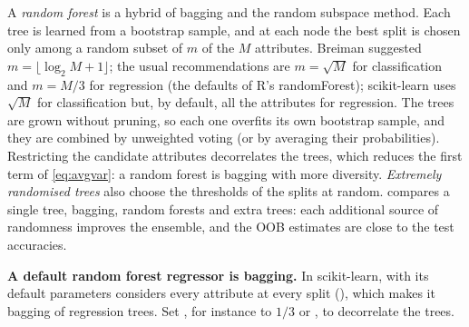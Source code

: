 A \emph{random forest} \citep{breiman2001random} is a hybrid of bagging and the random subspace
method. Each tree is learned from a bootstrap sample, and at each node the best split is chosen
only among a random subset of $m$ of the $M$ attributes. Breiman suggested
$m=\lfloor\log_2 M+1\rfloor$; the usual recommendations are $m=\sqrt M$ for classification and
$m=M/3$ for regression (the defaults of R's \textsf{randomForest}); \textsf{scikit-learn} uses $\sqrt M$ for
classification but, by default, all the attributes for regression. The trees are grown without pruning, so each one overfits its own
bootstrap sample, and they are combined by unweighted voting (or by averaging their
probabilities). Restricting the candidate attributes decorrelates the trees, which reduces the
first term of \cref{eq:avgvar}: a random forest is bagging with more diversity.
\emph{Extremely randomised trees} \citep{geurts2006extremely} also choose the
thresholds of the splits at random.  compares a single tree, bagging,
random forests and extra trees: each additional source of randomness improves the ensemble, and
the OOB estimates are close to the test accuracies.

\begin{pitfall}
\textbf{A default random forest regressor is bagging.} In \textsf{scikit-learn},  with its default
parameters considers every attribute at every split (), which makes it bagging of regression trees. Set , for instance to $1/3$ or , to decorrelate the trees.
\end{pitfall}

